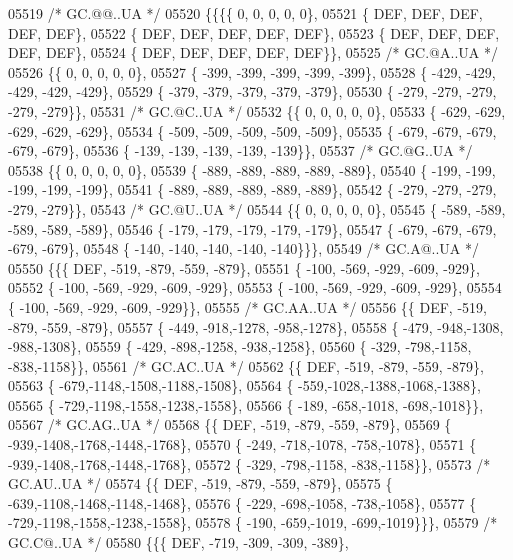 \begin{DoxyCode}
05519 \textcolor{comment}{/* GC.@@..UA */}
05520 \{\{\{\{    0,    0,    0,    0,    0\},
05521 \{  DEF,  DEF,  DEF,  DEF,  DEF\},
05522 \{  DEF,  DEF,  DEF,  DEF,  DEF\},
05523 \{  DEF,  DEF,  DEF,  DEF,  DEF\},
05524 \{  DEF,  DEF,  DEF,  DEF,  DEF\}\},
05525 \textcolor{comment}{/* GC.@A..UA */}
05526 \{\{    0,    0,    0,    0,    0\},
05527 \{ -399, -399, -399, -399, -399\},
05528 \{ -429, -429, -429, -429, -429\},
05529 \{ -379, -379, -379, -379, -379\},
05530 \{ -279, -279, -279, -279, -279\}\},
05531 \textcolor{comment}{/* GC.@C..UA */}
05532 \{\{    0,    0,    0,    0,    0\},
05533 \{ -629, -629, -629, -629, -629\},
05534 \{ -509, -509, -509, -509, -509\},
05535 \{ -679, -679, -679, -679, -679\},
05536 \{ -139, -139, -139, -139, -139\}\},
05537 \textcolor{comment}{/* GC.@G..UA */}
05538 \{\{    0,    0,    0,    0,    0\},
05539 \{ -889, -889, -889, -889, -889\},
05540 \{ -199, -199, -199, -199, -199\},
05541 \{ -889, -889, -889, -889, -889\},
05542 \{ -279, -279, -279, -279, -279\}\},
05543 \textcolor{comment}{/* GC.@U..UA */}
05544 \{\{    0,    0,    0,    0,    0\},
05545 \{ -589, -589, -589, -589, -589\},
05546 \{ -179, -179, -179, -179, -179\},
05547 \{ -679, -679, -679, -679, -679\},
05548 \{ -140, -140, -140, -140, -140\}\}\},
05549 \textcolor{comment}{/* GC.A@..UA */}
05550 \{\{\{  DEF, -519, -879, -559, -879\},
05551 \{ -100, -569, -929, -609, -929\},
05552 \{ -100, -569, -929, -609, -929\},
05553 \{ -100, -569, -929, -609, -929\},
05554 \{ -100, -569, -929, -609, -929\}\},
05555 \textcolor{comment}{/* GC.AA..UA */}
05556 \{\{  DEF, -519, -879, -559, -879\},
05557 \{ -449, -918,-1278, -958,-1278\},
05558 \{ -479, -948,-1308, -988,-1308\},
05559 \{ -429, -898,-1258, -938,-1258\},
05560 \{ -329, -798,-1158, -838,-1158\}\},
05561 \textcolor{comment}{/* GC.AC..UA */}
05562 \{\{  DEF, -519, -879, -559, -879\},
05563 \{ -679,-1148,-1508,-1188,-1508\},
05564 \{ -559,-1028,-1388,-1068,-1388\},
05565 \{ -729,-1198,-1558,-1238,-1558\},
05566 \{ -189, -658,-1018, -698,-1018\}\},
05567 \textcolor{comment}{/* GC.AG..UA */}
05568 \{\{  DEF, -519, -879, -559, -879\},
05569 \{ -939,-1408,-1768,-1448,-1768\},
05570 \{ -249, -718,-1078, -758,-1078\},
05571 \{ -939,-1408,-1768,-1448,-1768\},
05572 \{ -329, -798,-1158, -838,-1158\}\},
05573 \textcolor{comment}{/* GC.AU..UA */}
05574 \{\{  DEF, -519, -879, -559, -879\},
05575 \{ -639,-1108,-1468,-1148,-1468\},
05576 \{ -229, -698,-1058, -738,-1058\},
05577 \{ -729,-1198,-1558,-1238,-1558\},
05578 \{ -190, -659,-1019, -699,-1019\}\}\},
05579 \textcolor{comment}{/* GC.C@..UA */}
05580 \{\{\{  DEF, -719, -309, -309, -389\},

\end{DoxyCode}
